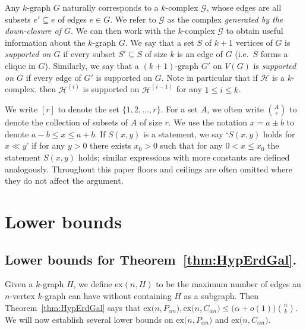 \documentclass[12pt,a4paper]{amsart}
\newcommand{\Hy}{\mathcal{H}}
\newcommand{\cG}{\mathcal{G}}
\newcommand{\ex}{\mathrm{ex}}
\begin{document}
Any $k$-graph $G$ naturally corresponds to a $k$-complex $\cG$, whose edges are all subsets $e' \subseteq e$ of edges $e \in G$. We refer to $\cG$ as the complex \emph{generated by the down-closure of $G$}. We can then work with the $k$-complex $\cG$ to obtain useful information about the $k$-graph $G$. We say that a set $S$ of $k+1$ vertices of $G$ is \emph{supported on $G$} if every subset $S' \subseteq S$ of size $k$ is an edge of $G$ (i.e.~$S$ forms a clique in $G$). Similarly, we say that a $(k+1)$-graph $G'$ on $V(G)$ is \emph{supported on $G$} if every edge of $G'$ is supported on $G$. Note in particular that if $\Hy$ is a $k$-complex, then $\Hy^{(i)}$ is supported on $\Hy^{(i-1)}$ for any $1 \leq i \leq k$.

We write $[r]$ to denote the set $\{1, 2, \dots, r\}$. For a set $A$, we often
write $\binom{A}{r}$ to denote the collection of subsets of $A$ of size $r$. We
use the notation $x=a\pm b$ to denote $a-b\leq x \leq a+b$. If $S(x,y)$ is a
statement, we say `$S(x,y)$ holds for $x \ll y$' if for any $y >
0$ there exists $x_0 > 0$ such that for any $0<x \leq x_0$ the statement
$S(x,y)$ holds; similar expressions with more constants are defined analogously.
Throughout this paper floors and ceilings are often omitted where they do not
affect the argument.

\section{Lower bounds}
\label{sec:LB}

\subsection{Lower bounds for Theorem~\ref{thm:HypErdGal}.}

Given a $k$-graph $H$, we define $\ex(n,H)$ to be the maximum number of edges an $n$-vertex $k$-graph can have without containing $H$ as a subgraph. Then Theorem~\ref{thm:HypErdGal} says that $\ex\big(n,P_{\alpha n}\big),\ex\big(n,C_{\alpha n}\big)\le\big(\alpha+o(1)\big)\binom{n}{k}$. We will now establish several lower bounds on $\ex\big(n,P_{\alpha n}\big)$ and $\ex\big(n,C_{\alpha n}\big)$.
\end{document}
